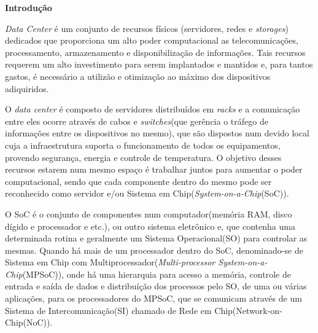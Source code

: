 \documentclass[a4paper,12pt]{article}
\begin{document}
\begin{center}
\textbf{{\LARGE Introdução}} \\ \vspace{0.5cm}
\end{center}

\textit{Data Center} é um conjunto de recursos físicos (servidores, redes e \textit{storages}) dedicados que proporciona um alto poder computacional as telecomunicações, processamento, armazenamento e disponibilização de informações. Tais recursos requerem um alto investimento para serem implantados e mantidos e, para tantos gastos, é necessário a utilizão e otimização ao máximo dos dispositivos adiquiridos.

O \textit{data center} é composto de servidores distribuídos em \textit{racks} e a comunicação entre eles ocorre através de cabos e \textit{switches}(que gerência o tráfego de informações entre os dispositivos no mesmo), que são dispostos num devido local cuja a infraestrutura suporta o funcionamento de todos os equipamentos, provendo segurança, energia e controle de temperatura. O objetivo desses recursos estarem num mesmo espaço é trabalhar juntos para aumentar o poder computacional, sendo que cada componente dentro do mesmo pode ser reconhecido como servidor e/ou Sistema em Chip(\textit{System-on-a-Chip}(SoC)).

O SoC é o conjunto de componentes num computador(memória RAM, disco dígido e processador e etc.), ou outro sistema eletrônico e, que contenha uma determinada rotina e geralmente um Sistema Operacional(SO) para controlar as mesmas. Quando há mais de um processador dentro do SoC, denominado-se de Sistema em Chip com Multiprocessador(\textit{Multi-processor System-on-a-Chip}(MPSoC)), onde há uma hierarquia para acesso a memória, controle de entrada e saída de dados e distribuíção dos processos pelo SO, de uma ou várias aplicações, para os processadores do MPSoC, que se comunicam através de um Sistema de Intercomunicação(SI) chamado de Rede em Chip(Network-on-Chip(NoC)).
\end{document}
